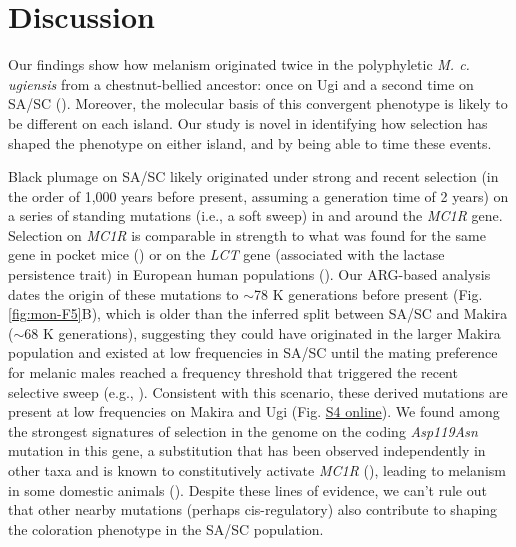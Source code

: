 


\section{Discussion}
Our findings show how melanism originated twice in the polyphyletic \textit{M. c. ugiensis} from a chestnut-bellied ancestor: once on Ugi and a second time on \ac{SA/SC} (\cite{uy2016mutations,cooper2017genomic}). Moreover, the molecular basis of this convergent phenotype is likely to be different on each island. Our study is novel in identifying how selection has shaped the phenotype on either island, and by being able to time these events.

Black plumage on \ac{SA/SC} likely originated under strong and recent selection (in the order of 1,000 years before present, assuming a generation time of 2 years) on a series of standing mutations (i.e., a soft sweep) in and around the \textit{MC1R} gene. Selection on \textit{MC1R} is comparable in strength to what was found for the same gene in pocket mice (\cite{hoekstra2004ecological}) or on the \textit{LCT} gene (associated with the lactase persistence trait) in European human populations (\cite{hejase_deep-learning_2022,bersaglieri_genetic_2004}). Our \ac{ARG}-based analysis dates the origin of these mutations to $\sim$78 K generations before present (Fig. \ref{fig:mon-F5}B), which is older than the inferred split between \ac{SA/SC} and Makira ($\sim$68 K generations), suggesting they could have originated in the larger Makira population and existed at low frequencies in \ac{SA/SC} until the mating preference for melanic males reached a frequency threshold that triggered the recent selective sweep (e.g., \cite{kokko2002sexual}). Consistent with this scenario, these derived mutations are present at low frequencies on Makira and Ugi (Fig. \href{https://journals.plos.org/PLOSGENETICS/article?id=10.1371/journal.pgen.1010474#sec017}{S4 online}). We found among the strongest signatures of selection in the genome on the coding \textit{Asp119Asn} mutation in this gene, a substitution that has been observed independently in other taxa and is known to constitutively activate \textit{MC1R} (\cite{lu1998ligand}), leading to melanism in some domestic animals (\cite{mundy2005window,kijas1998melanocortin,vaage1999molecular}). Despite these lines of evidence, we can’t rule out that other nearby mutations (perhaps cis-regulatory) also contribute to shaping the coloration phenotype in the \ac{SA/SC} population.

